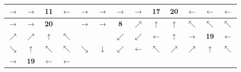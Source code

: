 \begin{center}
\begin{minipage}{\textwidth}
\renewcommand{\arraystretch}{1.4}
\begin{table}[H]
\centering 
\begin{scriptsize}
\begin{tabular}{|>{}c|>{}c|>{}c|>{}c||>{}c|>{}c|>{}c|>{}c|>{}c||>{}c|>{}c|>{}c|>{}c|}
\hline
\cellcolor{red!15!white}$\rightarrow$&\cellcolor{red!15!white}$\rightarrow$&\cellcolor{red!15!white}\bf{11}&\cellcolor{red!15!white}$\leftarrow$&
\cellcolor{green!15!white}$\rightarrow$&\cellcolor{green!15!white}$\rightarrow$&\cellcolor{green!15!white}$\rightarrow$&\cellcolor{green!15!white}$\rightarrow$&\cellcolor{green!15!white}\bf{17}&
\cellcolor{red!15!white}\bf{20}&\cellcolor{red!15!white}$\leftarrow$&\cellcolor{red!15!white}$\leftarrow$&\cellcolor{red!15!white}$\leftarrow$\\
\hline
\cellcolor{green!15!white}$\rightarrow$&\cellcolor{green!15!white}$\rightarrow$&\cellcolor{green!15!white}\bf{20}&\cellcolor{gray!50!white} &
\cellcolor{yellow!15!white}$\rightarrow$&\cellcolor{yellow!15!white}$\rightarrow$&\cellcolor{yellow!15!white}\bf{8}&\cellcolor{green!15!white}$\nearrow$&\cellcolor{green!15!white}$\uparrow$&
\cellcolor{red!15!white}$\uparrow$&\cellcolor{red!15!white}$\nwarrow$&\cellcolor{red!15!white}$\nwarrow$&\cellcolor{red!15!white}$\nwarrow$ \\
\hline
\cellcolor{green!15!white}$\nearrow$&\cellcolor{green!15!white}$\nearrow$&\cellcolor{green!15!white}$\uparrow$&\cellcolor{green!15!white}$\nwarrow$&
\cellcolor{gray!50!white} &\cellcolor{gray!50!white} &\cellcolor{blue!15!white}$\swarrow$&\cellcolor{blue!15!white}$\swarrow$&\cellcolor{blue!15!white}$\leftarrow$ &\cellcolor{red!15!white}$\uparrow$&\cellcolor{green!15!white}$\rightarrow$ &\cellcolor{green!15!white}\bf{19}&\cellcolor{green!15!white}$\leftarrow$ \\
\hline
\cellcolor{red!15!white}$\searrow$&\cellcolor{green!15!white}$\uparrow$&\cellcolor{green!15!white}$\nwarrow$&\cellcolor{green!15!white}$\nwarrow$&
\cellcolor{blue!15!white}$\searrow$&\cellcolor{blue!15!white}$\downarrow$&\cellcolor{blue!15!white}$\swarrow$&\cellcolor{blue!15!white}$\leftarrow$&\cellcolor{blue!15!white}$\nwarrow$ 
&\cellcolor{green!15!white}$\nearrow$&\cellcolor{green!15!white}$\nearrow$&\cellcolor{green!15!white}$\uparrow$&\cellcolor{green!15!white}$\nwarrow$ \\
\hline
\cellcolor{red!15!white}$\rightarrow$&\cellcolor{red!15!white}\bf{19}&\cellcolor{red!15!white}$\leftarrow$&\cellcolor{red!15!white}$\leftarrow$&

\end{tabular}
\end{scriptsize}
\end{table}
\end{minipage}
\end{center}
